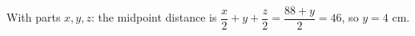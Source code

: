 With parts $x,y,z$: the midpoint distance is $\dfrac x2+y+\dfrac z2=\dfrac{88+y}2=46$, so $y=\boxed{4}$ cm.
